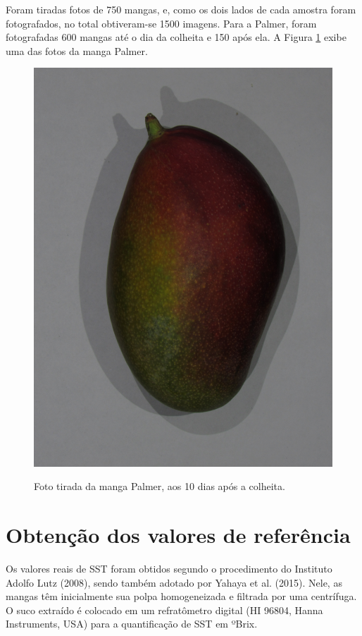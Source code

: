 Foram tiradas fotos de 750 mangas, e, como os dois lados de cada amostra foram fotografados, no total obtiveram-se 1500 imagens. Para a Palmer, foram fotografadas 600 mangas até o dia da colheita e 150 após ela. A Figura \ref{img:palmer_tommy} exibe uma das fotos da manga Palmer.

\begin{figure}[H]
\centering
    \caption{\label{img:palmer_tommy} Foto tirada da manga Palmer, aos 10 dias após a colheita.}
    {\includegraphics[scale=0.16]{img/palmer}}
\end{figure}

\section{Obtenção dos valores de referência}

Os valores reais de SST foram obtidos segundo o procedimento do Instituto Adolfo Lutz (2008), sendo também adotado por Yahaya et al. (2015). Nele, as mangas têm inicialmente sua polpa homogeneizada e filtrada por uma centrífuga. O suco extraído é colocado em um refratômetro digital (HI 96804, Hanna Instruments, USA) para a quantificação de SST em ºBrix.

